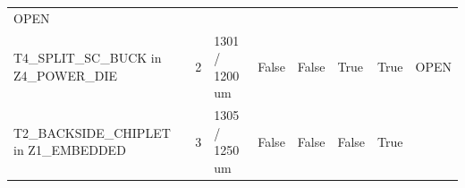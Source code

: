 \documentclass[10pt,]{article}
\begin{document}
\begin{longtable}[]{@{}llllllll@{}}
\begin{minipage}[t]{0.10\columnwidth}
OPEN\strut
\end{minipage}\tabularnewline
\begin{minipage}[t]{0.10\columnwidth}\raggedright
T4\_SPLIT\_SC\_BUCK in Z4\_POWER\_DIE\strut
\end{minipage} & \begin{minipage}[t]{0.10\columnwidth}\raggedright
2\strut
\end{minipage} & \begin{minipage}[t]{0.10\columnwidth}\raggedright
1301 / 1200 um\strut
\end{minipage} & \begin{minipage}[t]{0.10\columnwidth}\raggedright
False\strut
\end{minipage} & \begin{minipage}[t]{0.10\columnwidth}\raggedright
False\strut
\end{minipage} & \begin{minipage}[t]{0.10\columnwidth}\raggedright
True\strut
\end{minipage} & \begin{minipage}[t]{0.10\columnwidth}\raggedright
True\strut
\end{minipage} & \begin{minipage}[t]{0.10\columnwidth}\raggedright
OPEN\strut
\end{minipage}\tabularnewline
\begin{minipage}[t]{0.10\columnwidth}\raggedright
T2\_BACKSIDE\_CHIPLET in Z1\_EMBEDDED\strut
\end{minipage} & \begin{minipage}[t]{0.10\columnwidth}\raggedright
3\strut
\end{minipage} & \begin{minipage}[t]{0.10\columnwidth}\raggedright
1305 / 1250 um\strut
\end{minipage} & \begin{minipage}[t]{0.10\columnwidth}\raggedright
False\strut
\end{minipage} & \begin{minipage}[t]{0.10\columnwidth}\raggedright
False\strut
\end{minipage} & \begin{minipage}[t]{0.10\columnwidth}\raggedright
False\strut
\end{minipage} & \begin{minipage}[t]{0.10\columnwidth}\raggedright
True\strut
\end{minipage} & \begin{minipage}[t]{0.10\columnwidth}\raggedright

\end{minipage}
\end{longtable}
\end{document}
